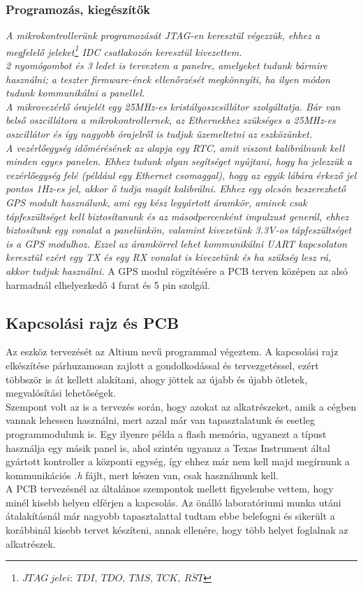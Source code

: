 \documentclass[a4paper, 12pt]{article}
\newcommand{\tab}{\hspace*{1em}}
\begin{document}
\subsubsection{Programozás, kiegészítők}
\emph{ \tab A mikrokontrollerünk programozását JTAG-en keresztül végezzük, ehhez a megfelelő jeleket\footnote{$JTAG\ jelei:\ TDI,\ TDO,\ TMS,\ TCK,\ \overline{RST}$} IDC csatlakozón keresztül kivezettem.\\
2 nyomógombot és 3 ledet is terveztem a panelre, amelyeket tudunk bármire használni; a teszter firmware-ének ellenőrzését megkönnyíti, ha ilyen módon tudunk kommunikálni a panellel.\\
A mikrovezérlő órajelét egy 25MHz-es kristályoszcsillátor szolgáltatja. Bár van belső oszcillátora a mikrokontrollernek, az Ethernekhez szükséges a 25MHz-es oszcillátor és így nagyobb órajelről is tudjuk üzemeltetni az eszközünket.\\
A vezérlőegység időmérésének az alapja egy RTC, amit viszont kalibrálnunk kell minden egyes panelen. Ehhez tudunk olyan segítséget nyújtani, hogy ha jelezzük a vezérlőegység felé (például egy Ethernet csomaggal), hogy az egyik lábára érkező jel pontos 1Hz-es jel, akkor ő tudja magát kalibrálni. Ehhez egy olcsón beszerezhető GPS modult használunk, ami egy kész legyártott áramkör, aminek csak tápfeszültséget kell biztosítanunk és az másodpercenként impulzust generál, ehhez biztosítunk egy vonalat a panelünkön, valamint kivezetünk 3.3V-os tápfeszültséget is a GPS modulhoz. Ezzel az áramkörrel lehet kommunikálni UART kapcsolaton keresztül ezért egy TX és egy RX vonalat is kivezetünk és ha szükség lesz rá, akkor tudjuk használni.} A GPS modul rögzítésére a PCB terven középen az alsó harmadnál elhelyezkedő 4 furat és 5 pin szolgál.


\subsection{Kapcsolási rajz és PCB}
\tab Az eszköz tervezését az Altium\textregistered{} nevű programmal végeztem. A kapcsolási rajz elkészítése párhuzamosan zajlott a gondolkodással és tervezgetéssel, ezért többször is át kellett alakítani, ahogy jöttek az újabb és újabb ötletek, megvalósítási lehetőségek.\\
Szempont volt az is a tervezés során, hogy azokat az alkatrészeket, amik a cégben vannak lehessen használni, mert azzal már van tapasztalatunk és esetleg programmodulunk is. Egy ilyenre példa a flash memória, ugyanezt a típust használja egy másik panel is, ahol szintén ugyanaz a Texas Instrument által gyártott kontroller a központi egység, így ehhez már nem kell majd megírnunk a kommunikációs \emph{.h} fájlt, mert készen van, csak használnunk kell.\\
A PCB tervezésnél az általános szempontok mellett figyelembe vettem, hogy minél kisebb helyen elférjen a kapcsolás. Az önálló laboratóriumi munka utáni átalakításnál már nagyobb tapasztalattal tudtam ebbe belefogni és sikerült a korábbinál kisebb tervet készíteni, annak ellenére, hogy több helyet foglalnak az alkatrészek.
\end{document}
